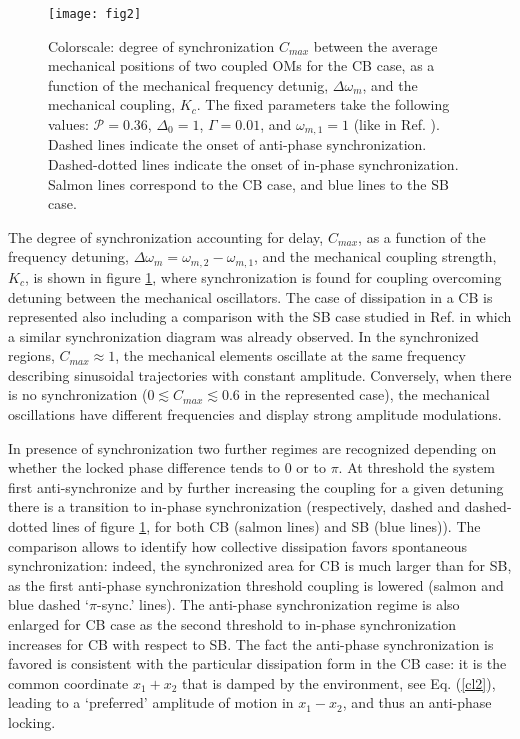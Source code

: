 \documentclass[a4paper]{jpconf}
\begin{document}
\begin{figure}[H]
 \centering
 \texttt{[image: fig2]}
 \caption{\label{figuretwo} Colorscale: degree of synchronization $C_{max}$
 between the 
 average mechanical positions of two 
coupled OMs  for the CB case, as a function of the mechanical 
frequency detunig, $\Delta\omega_m$, and the mechanical coupling, $K_c$. The 
fixed parameters take the following values: $\mathcal{P}=0.36$, $\Delta_0=1$, 
$\Gamma=0.01$, and $\omega_{m,1}=1$ (like in 
Ref. \cite{9}). Dashed lines indicate the onset of 
anti-phase synchronization. Dashed-dotted lines indicate the onset of in-phase 
synchronization. Salmon lines correspond to the CB case, and blue lines to 
the SB case.}
\end{figure}

The degree of synchronization accounting for delay, $C_{max}$, 
as a function of the frequency detuning, 
$\Delta\omega_m=\omega_{m,2}-\omega_{m,1}$, and the mechanical coupling 
strength, $K_c$, is shown in figure \ref{figuretwo}, where synchronization is found for coupling overcoming detuning
between the mechanical oscillators.
The case of dissipation in a CB is represented also including a comparison  with the SB case studied in 
Ref. \cite{9} in which a similar synchronization diagram was already observed. 
In the synchronized regions, $C_{max}\approx1$, the 
mechanical elements oscillate at the same frequency describing sinusoidal 
trajectories with constant amplitude. Conversely, when there is no 
synchronization ($0 \lesssim C_{max}\lesssim 0.6$ in the represented case), the mechanical oscillations have 
different frequencies and display strong amplitude modulations. 

In presence of synchronization two further regimes are recognized depending on whether the locked 
phase difference tends to $0$ or to $\pi$. At threshold the system first anti-synchronize and  
by further  increasing the coupling for a given detuning there is a transition to in-phase synchronization
(respectively, dashed and dashed-dotted 
lines of figure \ref{figuretwo}, for both CB (salmon lines) and SB (blue lines)). 
The comparison allows to identify how collective dissipation favors spontaneous synchronization: indeed, the
synchronized area for CB is much larger than for SB, as the first anti-phase synchronization threshold coupling is lowered (salmon and blue dashed `$\pi$-sync.' lines).
The anti-phase synchronization
regime is also enlarged for CB case as the second threshold to in-phase synchronization increases for CB with respect to SB.
The fact the anti-phase synchronization is favored is consistent with the particular dissipation form in the CB case: it is the 
common coordinate $x_1+x_2$ that is damped by the environment, see Eq. (\ref{cl2}), leading
to a `preferred' amplitude of motion in $x_1-x_2$, and thus an anti-phase locking. 
\end{document}
